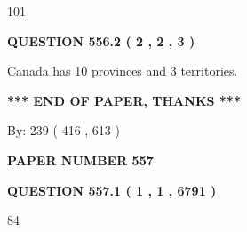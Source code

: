 \documentclass[12pt]{article}
\begin{document}
  
 
 
\noindent{}

101
 
 
  
\vspace{0.2in}
  
{\textbf{\Large{QUESTION
556.2 
 ( 2 , 2 , 3 )
}}}
  
  
 
 
\noindent{}
 
 
Canada has 10  provinces and 3 territories.
 
 
 
 
   
   
 \vspace{0.2in}
 
   
   
   
   
\vspace{1.0in} 
{\textbf{\large{ *** END OF PAPER, THANKS *** }}} 
   
   
\hspace{1.0in} By: 
 239 ( 416 ,  613 )
   
   
   
   
\newpage 
\setcounter{page}{ 
   557001 } 
   
   
   
   
 {\textbf{ \Large{ PAPER NUMBER  557  }}}
   
   
\vspace{0.2in}
   
   
   
   
   
   
 \vspace{0.2in}
 
 
 
 
   
   
  
\vspace{0.2in}
  
{\textbf{\Large{QUESTION
557.1 
 ( 1 , 1 , 6791 )
}}}
  
  
 
 
\noindent{}

84
 
\end{document}
